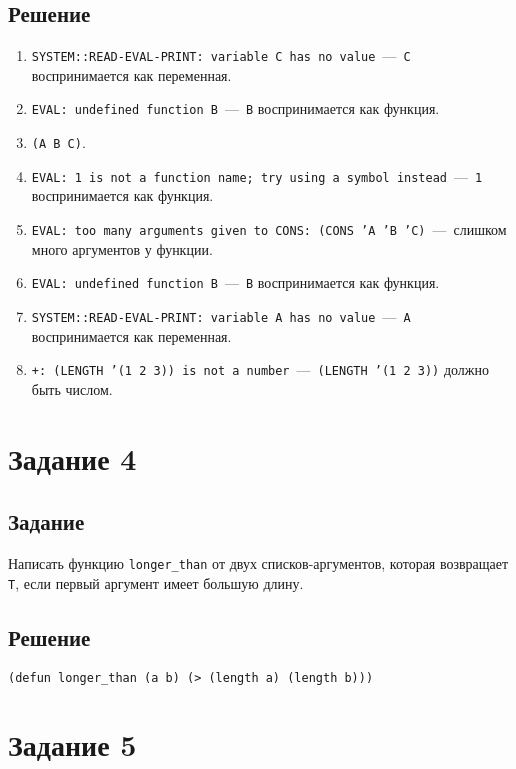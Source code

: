 \subsection*{Решение}
\begin{enumerate}
	\item \texttt{SYSTEM::READ-EVAL-PRINT: variable C has no value}~---~\texttt{C} воспринимается как переменная.
	\item \texttt{EVAL: undefined function B}~---~\texttt{B} воспринимается как функция.
	\item \texttt{(A B C)}.
	\item \texttt{EVAL: 1 is not a function name; try using a symbol instead}~---~\texttt{1} воспринимается как функция.
	\item \texttt{EVAL: too many arguments given to CONS: (CONS 'A 'B 'C)}~---~слишком много аргументов у функции.
	\item \texttt{EVAL: undefined function B}~---~\texttt{B} воспринимается как функция.
	\item \texttt{SYSTEM::READ-EVAL-PRINT: variable A has no value}~---~\texttt{A} воспринимается как переменная.
	\item \texttt{+: (LENGTH '(1 2 3)) is not a number}~---~\texttt{(LENGTH '(1 2 3))} должно быть числом.
\end{enumerate}

\section{Задание 4}
\subsection*{Задание}
Написать функцию \texttt{longer\_than} от двух списков-аргументов, которая возвращает \texttt{Т}, если первый аргумент имеет большую длину.


\subsection*{Решение}
\begin{code}
\begin{verbatim}
(defun longer_than (a b) (> (length a) (length b)))
\end{verbatim}
\end{code}

\section{Задание 5}
